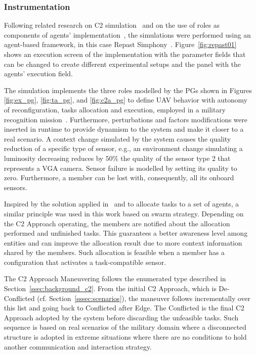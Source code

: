 \subsubsection{Instrumentation}
\label{sssec:instrumentation}

Following related research on C2 simulation~\citep{FRANCE2014, Fernandes2016, Stanton2007, c2-02} and on the use of roles as components of agents' implementation~\citep{agent0010, agent1}, the simulations were performed using an agent-based framework, in this case Repast Simphony~\citep{North2013, SIMUL01, ClaesWohlinPerRuneson2012}. Figure~\ref{fig:repast01} shows an execution screen of the implementation \color{black} with the parameter fields \color{black} that can be changed to create different experimental setups \color{black} and the panel \color{black} with the agents' execution field.

The simulation implements the three roles modelled by the PGs shown in Figures \color{black} \ref{fig:ex_pg}, \ref{fig:ta_pg}, and \ref{fig:c2a_pg}  \color{black} to define UAV behavior with autonomy of reconfiguration, tasks allocation and execution, employed in a military recognition mission~\citep{UAV_Aplication}. Furthermore, perturbations and factors modifications were inserted in runtime to provide dynamism to the system and make it closer to a real scenario. A context change simulated by the system causes the quality reduction of a specific type of sensor, e.g., an environment change simulating a luminosity decreasing \color{black} reduces by $50\%$ \color{black} the quality of the sensor type 2 that represents a VGA camera. Sensor failure is modelled by setting its quality to zero. Furthermore, a member \color{black} can be lost with, consequently, \color{black} all its onboard sensors.

Inspired by the solution applied in~\citet{MAS07} and \citet{UAV01} to allocate tasks to a set of agents, a similar principle was used in this work based on swarm strategy. Depending on the C2 Approach \color{black}operating\color{black}, the members are notified about the allocation performed and unfinished tasks. This guarantees a better awareness level among entities and can improve the allocation result due to more context information shared by the members. Such allocation is feasible when a member has a configuration that activates a \color{black}task-compatible sensor\color{black}.

The C2 Approach \color{black}Maneuvering \color{black}follows the enumerated type described in Section~\ref{ssec:background_c2}. From the initial C2 Approach, which is De-Conflicted (cf. Section~\ref{sssec:scenarios}), the maneuver follows incrementally over this list and going back to Conflicted after Edge. The Conflicted is the final C2 Approach adopted by the system before discarding the unfeasible tasks. Such sequence is based on real scenarios of the military domain where a disconnected structure is adopted in extreme situations where there are no conditions to hold another communication and interaction strategy.



